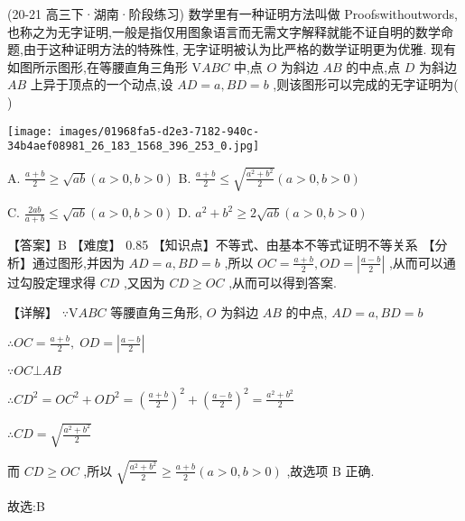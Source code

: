 \documentclass[11pt,a4paper]{article}
\begin{document}
\begin{hmwk} 
 (20-21 高三下·湖南·阶段练习) 数学里有一种证明方法叫做 Proofswithoutwords, 也称之为无字证明,一般是指仅用图象语言而无需文字解释就能不证自明的数学命题,由于这种证明方法的特殊性, 无字证明被认为比严格的数学证明更为优雅. 现有如图所示图形,在等腰直角三角形 \(\displaystyle \mathrm{V}{ABC}\) 中,点 \(\displaystyle O\) 为斜边 \(\displaystyle {AB}\) 的中点,点 \(\displaystyle D\) 为斜边 \(\displaystyle {AB}\) 上异于顶点的一个动点,设 \(\displaystyle {AD} = a,{BD} = b\) ,则该图形可以完成的无字证明为(   )


\texttt{[image: images/01968fa5-d2e3-7182-940c-34b4aef08981\_26\_183\_1568\_396\_253\_0.jpg]}

 

A. \(\displaystyle \frac{a + b}{2} \geq  \sqrt{ab}\left( {a > 0,b > 0}\right)\) B. \(\displaystyle \frac{a + b}{2} \leq  \sqrt{\frac{{a}^{2} + {b}^{2}}{2}}\left( {a > 0,b > 0}\right)\)

C. \(\displaystyle \frac{2ab}{a + b} \leq  \sqrt{ab}\left( {a > 0,b > 0}\right)\) D. \(\displaystyle {a}^{2} + {b}^{2} \geq  2\sqrt{ab}\left( {a > 0,b > 0}\right)\)

\begin{jiexi}
【答案】B 【难度】 0.85 【知识点】不等式、由基本不等式证明不等关系 【分析】通过图形,并因为 \(\displaystyle {AD} = a,{BD} = b\) ,所以 \(\displaystyle {OC} = \frac{a + b}{2},{OD} = \left| \frac{a - b}{2}\right|\) ,从而可以通过勾股定理求得 \(\displaystyle {CD}\) ,又因为 \(\displaystyle {CD} \geq  {OC}\) ,从而可以得到答案.

【详解】 \(\displaystyle \because \mathrm{V}{ABC}\) 等腰直角三角形, \(\displaystyle O\) 为斜边 \(\displaystyle {AB}\) 的中点, \(\displaystyle {AD} = a,{BD} = b\)

\(\displaystyle \therefore {OC} = \frac{a + b}{2},\;{OD} = \left| \frac{a - b}{2}\right|\)

\(\displaystyle \because {OC} \bot  {AB}\)

\(\displaystyle \therefore C{D}^{2} = O{C}^{2} + O{D}^{2} = {\left( \frac{a + b}{2}\right) }^{2} + {\left( \frac{a - b}{2}\right) }^{2} = \frac{{a}^{2} + {b}^{2}}{2}\)

\(\displaystyle \therefore {CD} = \sqrt{\frac{{a}^{2} + {b}^{2}}{2}}\)

而 \(\displaystyle {CD} \geq  {OC}\) ,所以 \(\displaystyle \sqrt{\frac{{a}^{2} + {b}^{2}}{2}} \geq  \frac{a + b}{2}\left( {a > 0,b > 0}\right)\) ,故选项 \(\displaystyle \mathrm{B}\) 正确.

故选:B


\end{jiexi}
\end{hmwk}
\end{document}
